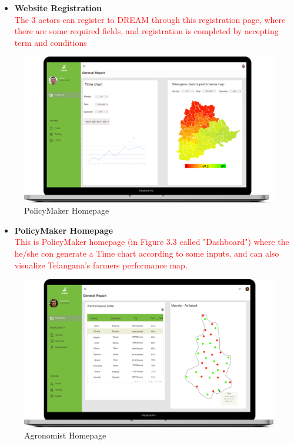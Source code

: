 \begin{itemize}
    \item \textbf{Website Registration}\\ 
    \textcolor{red}{The 3 actors can register to DREAM through this registration page, where there are some required fields, and registration is completed by accepting term and conditions}
\end{itemize}


\begin{figure}[H]
  \includegraphics[width=140mm,scale=0.9]{./Images//Mocks/WebApp/PolicyMaker.png}
  \caption{PolicyMaker Homepage}
\end{figure}

\begin{itemize}
    \item \textbf{PolicyMaker Homepage}\\ 
    \textcolor{red}{This is PolicyMaker homepage (in Figure 3.3 called "Dashboard") where the he/she con generate a Time chart according to some inputs, and can also visualize Telangana's farmers performance map.}
\end{itemize}


\begin{figure}[H]
  \includegraphics[width=140mm,scale=0.9]{./Images//Mocks/WebApp/Agronomist_Home.png}
  \caption{Agronomist Homepage}
\end{figure}

